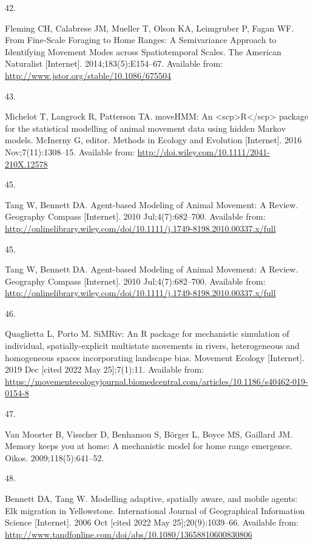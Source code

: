 \documentclass[10pt,a4paper]{article}
\newlength{\cslhangindent}
\newlength{\csllabelwidth}
\newlength{\cslentryspacingunit} %
\newenvironment{CSLReferences}[2] %
 {%
  \setlength{\parindent}{0pt}
  \ifodd #1
  \let\oldpar\par
  \def\par{\hangindent=\cslhangindent\oldpar}
  \fi
  \setlength{\parskip}{#2\cslentryspacingunit}
 }%
 {}
\newcommand{\CSLLeftMargin}[1]{\parbox[t]{\csllabelwidth}{#1}}
\newcommand{\CSLRightInline}[1]{\parbox[t]{\linewidth - \csllabelwidth}{#1}\break}
\begin{document}
\begin{CSLReferences}{0}{0}
\leavevmode\hypertarget{ref-Fleming2014}{}%
\CSLLeftMargin{42. }
\CSLRightInline{Fleming CH, Calabrese JM, Mueller T, Olson KA, Leimgruber P, Fagan WF. From {Fine}-{Scale} {Foraging} to {Home} {Ranges}: {A} {Semivariance} {Approach} to {Identifying} {Movement} {Modes} across {Spatiotemporal} {Scales}. The American Naturalist {[}Internet{]}. 2014;183(5):E154--67. Available from: \url{http://www.jstor.org/stable/10.1086/675504}}

\leavevmode\hypertarget{ref-Michelot2016}{}%
\CSLLeftMargin{43. }
\CSLRightInline{Michelot T, Langrock R, Patterson TA. {moveHMM}: An {\textless{}}scp{\textgreater{}}{R}{\textless{}}/scp{\textgreater{}} package for the statistical modelling of animal movement data using hidden {Markov} models. McInerny G, editor. Methods in Ecology and Evolution {[}Internet{]}. 2016 Nov;7(11):1308--15. Available from: \url{http://doi.wiley.com/10.1111/2041-210X.12578}}

\leavevmode\hypertarget{ref-Tang2010}{}%
\CSLLeftMargin{45. }
\CSLRightInline{Tang W, Bennett DA. Agent-based {Modeling} of {Animal} {Movement}: {A} {Review}. Geography Compass {[}Internet{]}. 2010 Jul;4(7):682--700. Available from: \url{http://onlinelibrary.wiley.com/doi/10.1111/j.1749-8198.2010.00337.x/full}}

\leavevmode\hypertarget{ref-Tang2010}{}%
\CSLLeftMargin{45. }
\CSLRightInline{Tang W, Bennett DA. Agent-based {Modeling} of {Animal} {Movement}: {A} {Review}. Geography Compass {[}Internet{]}. 2010 Jul;4(7):682--700. Available from: \url{http://onlinelibrary.wiley.com/doi/10.1111/j.1749-8198.2010.00337.x/full}}

\leavevmode\hypertarget{ref-quaglietta_simriv_2019}{}%
\CSLLeftMargin{46. }
\CSLRightInline{Quaglietta L, Porto M. {SiMRiv}: An {R} package for mechanistic simulation of individual, spatially-explicit multistate movements in rivers, heterogeneous and homogeneous spaces incorporating landscape bias. Movement Ecology {[}Internet{]}. 2019 Dec {[}cited 2022 May 25{]};7(1):11. Available from: \url{https://movementecologyjournal.biomedcentral.com/articles/10.1186/s40462-019-0154-8}}

\leavevmode\hypertarget{ref-VanMoorter2009}{}%
\CSLLeftMargin{47. }
\CSLRightInline{Van Moorter B, Visscher D, Benhamou S, Börger L, Boyce MS, Gaillard JM. Memory keeps you at home: {A} mechanistic model for home range emergence. Oikos. 2009;118(5):641--52. }

\leavevmode\hypertarget{ref-bennett_modelling_2006}{}%
\CSLLeftMargin{48. }
\CSLRightInline{Bennett DA, Tang W. Modelling adaptive, spatially aware, and mobile agents: {Elk} migration in {Yellowstone}. International Journal of Geographical Information Science {[}Internet{]}. 2006 Oct {[}cited 2022 May 25{]};20(9):1039--66. Available from: \url{http://www.tandfonline.com/doi/abs/10.1080/13658810600830806}}


\end{CSLReferences}
\end{document}
